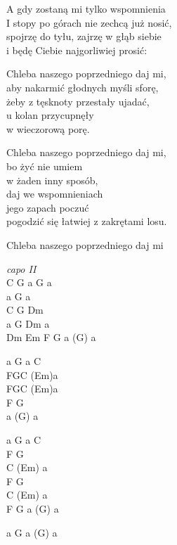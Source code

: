 \begin{text}
\hfill\break
\hfill\break
A gdy zostaną mi tylko wspomnienia\\
I stopy po górach nie zechcą już nosić,\\
spojrzę do tyłu, zajrzę w głąb siebie\\
i będę Ciebie najgorliwiej prosić:

\hfill\break
Chleba naszego poprzedniego daj mi,\\
aby nakarmić głodnych myśli sforę,\\
żeby z tęsknoty przestały ujadać,\\
u kolan przycupnęły\\
w wieczorową porę.

Chleba naszego poprzedniego daj mi,\\
bo żyć nie umiem\\
w żaden inny sposób,\\
daj we wspomnieniach\\
jego zapach poczuć\\
pogodzić się łatwiej z zakrętami losu.

Chleba naszego poprzedniego daj mi\\
\end{text}
\begin{chord}
\textit{capo II}\\
C G a G a\\
a G a\\
C G Dm\\
a G Dm a\\
Dm Em F G a (G) a

a G a C\\
FGC (Em)a\\
FGC (Em)a\\
F G\\
a (G) a

a G a C\\
F G\\
C (Em) a\\
F G\\
C (Em) a\\
F G a (G) a

a G a (G) a
\end{chord}
